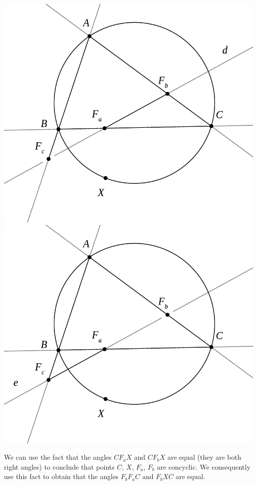 \documentclass[runningheads]{llncs}
\begin{document}
\centerline{%
  \includegraphics[width = \imgwidth]{simson2a.pdf}%
  \includegraphics[width = \imgwidth]{simson2b.pdf}%
}
\bigskip

We can use the fact that the angles $CF_aX$ and $CF_bX$ are equal
(they are both right angles) to conclude that points $C$, $X$,
$F_a$, $F_b$ are concyclic. We consequently use this fact to obtain that
the angles $F_bF_aC$ and $F_bXC$ are equal.
\end{document}
